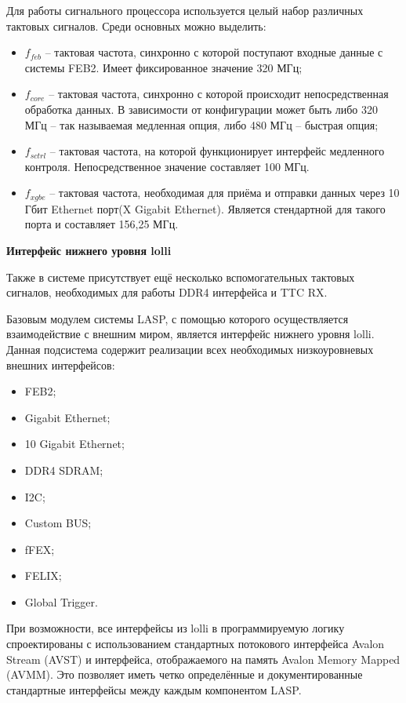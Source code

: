 Для работы сигнального процессора используется целый набор различных тактовых сигналов. Среди основных можно выделить:
\begin{itemize}
    \item $f_{feb}$ -- тактовая частота, синхронно с которой поступают входные данные с системы FEB2. Имеет фиксированное значение 320 МГц;
    \item $f_{core}$ --  тактовая частота, синхронно с которой происходит непосредственная обработка данных. В зависимости от конфигурации может быть либо 320 МГц -- так называемая медленная опция, либо 480 МГц -- быстрая опция;
    \item $f_{sctrl}$ -- тактовая частота, на которой функционирует интерфейс медленного контроля. Непосредственное значение составляет 100 МГц.
    \item $f_{xgbe}$ -- тактовая частота, необходимая для приёма и отправки данных через 10 Гбит Ethernet порт(X Gigabit Ethernet). Является стендартной для такого порта и составляет 156,25 МГц.
\end{itemize}\par
\textbf{Интерфейс нижнего уровня lolli}\par
Также в системе присутствует ещё несколько вспомогательных тактовых сигналов, необходимых для работы DDR4 интерфейса и TTC RX.\par
Базовым модулем системы LASP, с помощью которого осуществляется взаимодействие с внешним миром, является интерфейс нижнего уровня lolli. Данная подсистема содержит реализации всех необходимых низкоуровневых внешних интерфейсов:\par
\begin{itemize}
    \item FEB2;
    \item Gigabit Ethernet;
    \item 10 Gigabit Ethernet;
    \item DDR4 SDRAM;
    \item I2C;
    \item Custom BUS;
    \item fFEX;
    \item FELIX;
    \item Global Trigger.
\end{itemize}\par
При возможности, все интерфейсы из lolli в программируемую логику спроектированы с использованием стандартных потокового интерфейса Avalon Stream (AVST) и интерфейса, отображаемого на память Avalon Memory Mapped (AVMM). Это позволяет иметь четко определённые и документированные стандартные интерфейсы между каждым компонентом LASP.\par
